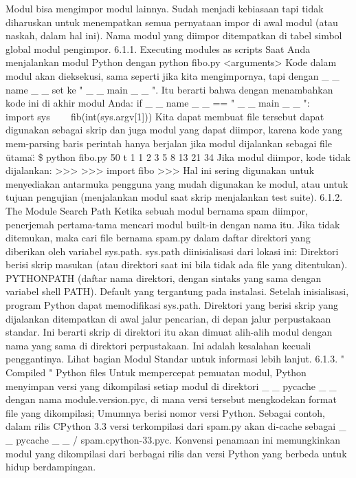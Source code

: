 Modul bisa mengimpor modul lainnya. Sudah menjadi kebiasaan tapi tidak diharuskan untuk menempatkan semua pernyataan impor di awal modul (atau naskah, dalam hal ini). Nama modul yang diimpor ditempatkan di tabel simbol global modul pengimpor.  
6.1.1. Executing modules as scripts  
Saat Anda menjalankan modul Python dengan  
python fibo.py <arguments>  
Kode dalam modul akan dieksekusi, sama seperti jika kita mengimpornya, tapi dengan    \_     \_  name   \_     \_   set ke "   \_     \_  main   \_     \_  ". Itu berarti bahwa dengan menambahkan kode ini di akhir modul Anda: 
if    \_     \_  name   \_     \_   == "   \_     \_  main   \_     \_  ":  
~~~ import sys 
~~~ fib(int(sys.argv[1])) 
Kita dapat membuat file tersebut dapat digunakan sebagai skrip dan juga modul yang dapat diimpor, karena kode yang mem-parsing baris perintah hanya berjalan jika modul dijalankan sebagai file \"utama\":  
   \$   python fibo.py 50 t 
1 1 2 3 5 8 13 21 34  
Jika modul diimpor, kode tidak dijalankan:  
>>>  
>>> import fibo  
>>>  
Hal ini sering digunakan untuk menyediakan antarmuka pengguna yang mudah digunakan ke modul, atau untuk tujuan pengujian (menjalankan modul saat skrip menjalankan test suite). 
6.1.2. The Module Search Path 
Ketika sebuah modul bernama spam diimpor, penerjemah pertama-tama mencari modul built-in dengan nama itu. Jika tidak ditemukan, maka cari file bernama spam.py dalam daftar direktori yang diberikan oleh variabel sys.path. sys.path diinisialisasi dari lokasi ini:  
Direktori berisi skrip masukan (atau direktori saat ini bila tidak ada file yang ditentukan).  
PYTHONPATH (daftar nama direktori, dengan sintaks yang sama dengan variabel shell PATH).  
Default yang tergantung pada instalasi. 
Setelah inisialisasi, program Python dapat memodifikasi sys.path. Direktori yang berisi skrip yang dijalankan ditempatkan di awal jalur pencarian, di depan jalur perpustakaan standar. Ini berarti skrip di direktori itu akan dimuat alih-alih modul dengan nama yang sama di direktori perpustakaan. Ini adalah kesalahan kecuali penggantinya. Lihat bagian Modul Standar untuk informasi lebih lanjut.  
6.1.3.   " Compiled  "  Python files  
Untuk mempercepat pemuatan modul, Python menyimpan versi yang dikompilasi setiap modul di direktori    \_     \_  pycache   \_     \_   dengan nama module.version.pyc, di mana versi tersebut mengkodekan format file yang dikompilasi; Umumnya berisi nomor versi Python. Sebagai contoh, dalam rilis CPython 3.3 versi terkompilasi dari spam.py akan di-cache sebagai    \_     \_  pycache    \_     \_   / spam.cpython-33.pyc. Konvensi penamaan ini memungkinkan modul yang dikompilasi dari berbagai rilis dan versi Python yang berbeda untuk hidup berdampingan.  
